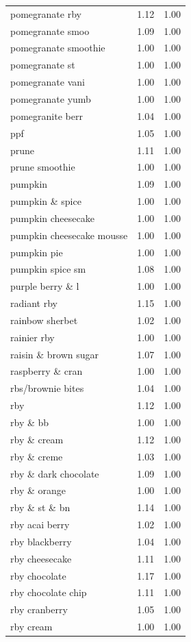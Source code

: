 \begin{table}
\begin{tabular}{lrr}
pomegranate rby & 1.12 & 1.00 \\
pomegranate smoo & 1.09 & 1.00 \\
pomegranate smoothie & 1.00 & 1.00 \\
pomegranate st & 1.00 & 1.00 \\
pomegranate vani & 1.00 & 1.00 \\
pomegranate yumb & 1.00 & 1.00 \\
pomegranite berr & 1.04 & 1.00 \\
ppf & 1.05 & 1.00 \\
prune & 1.11 & 1.00 \\
prune smoothie & 1.00 & 1.00 \\
pumpkin & 1.09 & 1.00 \\
pumpkin \& spice & 1.00 & 1.00 \\
pumpkin cheesecake & 1.00 & 1.00 \\
pumpkin cheesecake mousse & 1.00 & 1.00 \\
pumpkin pie & 1.00 & 1.00 \\
pumpkin spice sm & 1.08 & 1.00 \\
purple berry \& l & 1.00 & 1.00 \\
radiant rby & 1.15 & 1.00 \\
rainbow sherbet & 1.02 & 1.00 \\
rainier rby & 1.00 & 1.00 \\
raisin \& brown sugar & 1.07 & 1.00 \\
raspberry \& cran & 1.00 & 1.00 \\
rbs/brownie bites & 1.04 & 1.00 \\
rby & 1.12 & 1.00 \\
rby \& bb & 1.00 & 1.00 \\
rby \& cream & 1.12 & 1.00 \\
rby \& creme & 1.03 & 1.00 \\
rby \& dark chocolate & 1.09 & 1.00 \\
rby \& orange & 1.00 & 1.00 \\
rby \& st \& bn & 1.14 & 1.00 \\
rby acai berry & 1.02 & 1.00 \\
rby blackberry & 1.04 & 1.00 \\
rby cheesecake & 1.11 & 1.00 \\
rby chocolate & 1.17 & 1.00 \\
rby chocolate chip & 1.11 & 1.00 \\
rby cranberry & 1.05 & 1.00 \\
rby cream & 1.00 & 1.00 \\

\end{tabular}
\end{table}
